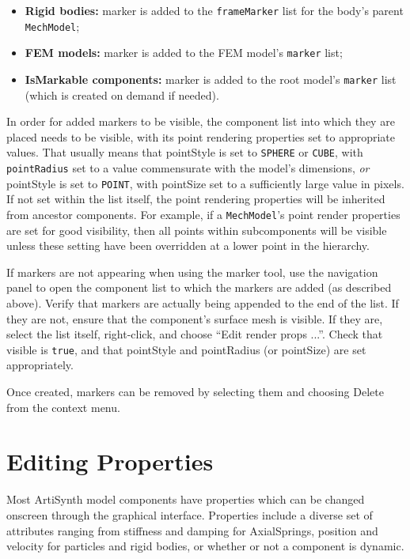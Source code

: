 \documentclass{article}
\begin{document}
\begin{itemize}
\item {\bf Rigid bodies:} marker is added to the {\tt frameMarker}
list for the body's parent {\tt MechModel};

\item {\bf FEM models:} marker is added to the FEM model's {\tt marker} list;

\item {\bf IsMarkable components:} marker is added to the root model's
{\tt marker} list (which is created on demand if needed).

\end{itemize}

In order for added markers to be visible, the component list into
which they are placed needs to be visible, with its point rendering
properties set to appropriate values. That usually means that {\sf
pointStyle} is set to {\tt SPHERE} or {\tt CUBE}, with {\tt
pointRadius} set to a value commensurate with the model's dimensions,
{\it or} {\sf pointStyle} is set to {\tt POINT}, with {\sf pointSize}
set to a sufficiently large value in pixels.  If not set within the
list itself, the point rendering properties will be inherited from
ancestor components. For example, if a {\tt MechModel}'s point render
properties are set for good visibility, then all points within
subcomponents will be visible unless these setting have been
overridden at a lower point in the hierarchy.

\begin{sideblock}
If markers are not appearing when using the marker tool, use the
navigation panel to open the component list to which the markers are
added (as described above). Verify that markers are actually being
appended to the end of the list. If they are not, ensure that the
component's surface mesh is visible. If they are, select the list
itself, right-click, and choose {\sf ``Edit render props ...''}. Check
that {\sf visible} is {\tt true}, and that {\sf pointStyle} and {\sf
pointRadius} (or {\sf pointSize}) are set appropriately.
\end{sideblock}

Once created, markers can be removed by selecting them and choosing
{\sf Delete} from the context menu.

\section{Editing Properties}

Most ArtiSynth model components have properties which can be 
changed onscreen through the graphical interface. Properties
include a diverse set of attributes ranging from stiffness and
damping for AxialSprings, position and velocity for particles and
rigid bodies, or whether or not a component is dynamic.
\end{document}
